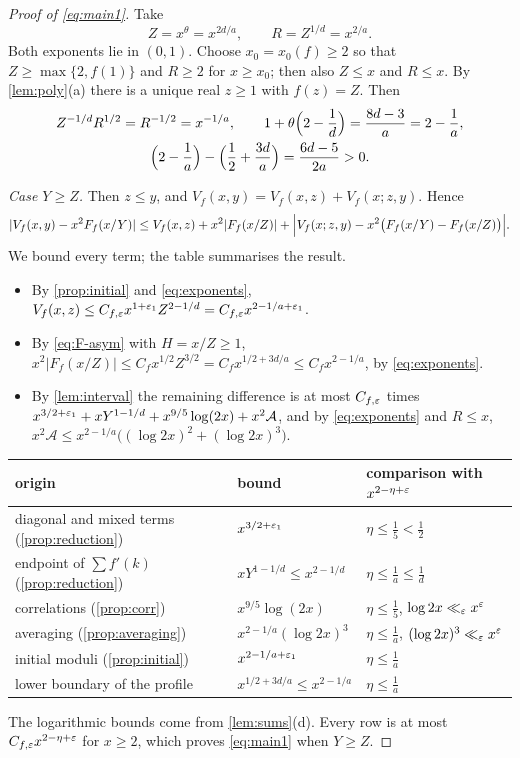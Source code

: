 \begin{proof}[Proof of \eqref{eq:main1}]
Take
\[
Z=x^\theta=x^{2d/a},\qquad R=Z^{1/d}=x^{2/a}.
\]
Both exponents lie in $(0,1)$. Choose $x_0=x_0(f)\ge2$ so that $Z\ge\max\{2,f(1)\}$ and $R\ge2$ for $x\ge x_0$; then also $Z\le x$ and $R\le x$. By \cref{lem:poly}(a) there is a unique real $z\ge1$ with $f(z)=Z$. Then
\begin{equation}\label{eq:exponents}
\begin{gathered}
Z^{-1/d}R^{1/2}=R^{-1/2}=x^{-1/a},\qquad1+\theta\Bigl(2-\frac1d\Bigr)=\frac{8d-3}a=2-\frac1a,\\
\Bigl(2-\frac1a\Bigr)-\Bigl(\frac12+\frac{3d}a\Bigr)=\frac{6d-5}{2a}>0.
\end{gathered}
\end{equation}

\emph{Case $Y\ge Z$.} Then $z\le y$, and $V_f(x,y)=V_f(x,z)+V_f(x;z,y)$. Hence
\[
|V_f(x,y)-x^2F_f(x/Y)|\le V_f(x,z)+x^2|F_f(x/Z)|+\Bigl|V_f(x;z,y)-x^2\bigl(F_f(x/Y)-F_f(x/Z)\bigr)\Bigr|.
\]
We bound every term; the table summarises the result.
\begin{itemize}
\item By \cref{prop:initial} and \eqref{eq:exponents}, $V_f(x,z)\le C_{f,\varepsilon}x^{1+\varepsilon_1}Z^{2-1/d}=C_{f,\varepsilon}x^{2-1/a+\varepsilon_1}$.
\item By \eqref{eq:F-asym} with $H=x/Z\ge1$, $x^2|F_f(x/Z)|\le C_fx^{1/2}Z^{3/2}=C_fx^{1/2+3d/a}\le C_fx^{2-1/a}$, by \eqref{eq:exponents}.
\item By \cref{lem:interval} the remaining difference is at most $C_{f,\varepsilon}$ times $x^{3/2+\varepsilon_1}+xY^{1-1/d}+x^{9/5}\log(2x)+x^2\mathcal A$, and by \eqref{eq:exponents} and $R\le x$, $x^2\mathcal A\le x^{2-1/a}\bigl((\log2x)^2+(\log2x)^3\bigr)$.
\end{itemize}
\begin{center}
\begin{tabular}{@{}lll@{}}
\toprule
origin & bound & comparison with $x^{2-\eta+\varepsilon}$\\
\midrule
diagonal and mixed terms (\cref{prop:reduction}) & $x^{3/2+\varepsilon_1}$ & $\eta\le\frac15<\frac12$\\
endpoint of $\sum f'(k)$ (\cref{prop:reduction}) & $xY^{1-1/d}\le x^{2-1/d}$ & $\eta\le\frac1a\le\frac1d$\\
correlations (\cref{prop:corr}) & $x^{9/5}\log(2x)$ & $\eta\le\frac15$, $\log2x\ll_\varepsilon x^{\varepsilon}$\\
averaging (\cref{prop:averaging}) & $x^{2-1/a}(\log2x)^3$ & $\eta\le\frac1a$, $(\log2x)^3\ll_\varepsilon x^{\varepsilon}$\\
initial moduli (\cref{prop:initial}) & $x^{2-1/a+\varepsilon_1}$ & $\eta\le\frac1a$\\
lower boundary of the profile & $x^{1/2+3d/a}\le x^{2-1/a}$ & $\eta\le\frac1a$\\
\bottomrule
\end{tabular}
\end{center}
The logarithmic bounds come from \cref{lem:sums}(d). Every row is at most $C_{f,\varepsilon}x^{2-\eta+\varepsilon}$ for $x\ge2$, which proves \eqref{eq:main1} when $Y\ge Z$.


\end{proof}
